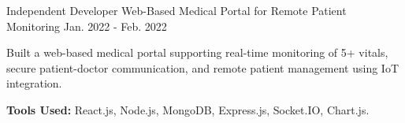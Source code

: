 

\begin{cventries}


  \cventry
    {Independent Developer} %
    {Web-Based Medical Portal for Remote Patient Monitoring } %
    {}%
    {Jan. 2022 - Feb. 2022} %
    {
      \begin{cvitems} %
        \item {Built a web-based medical portal supporting real-time monitoring of 5+ vitals, secure patient-doctor
        communication, and remote patient management using IoT integration.}
        \item {\textbf{Tools Used:} React.js, Node.js, MongoDB, Express.js, Socket.IO, Chart.js.}
      \end{cvitems}
    }



\end{cventries}

